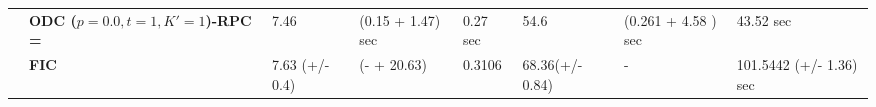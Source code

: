 {\begin{table}[htbp!]
{\begin{tabular}{|l|l|lll|lll|}
    & \textbf{ODC ($p= 0.0, t=1 , K'=1$)-RPC  = ~\cite{Chalupka:2013}} &   7.46    &   (0.15 + 1.47) sec &    0.27 sec   & 54.6  &  (0.261 + 4.58 ) sec & 43.52 sec\\%
    & \textbf{FIC ~\cite{fic06}} &   7.63 (+/- 0.4)  &   (- + 20.63)   &    0.3106     &   68.36(+/- 0.84)    &  -     & 101.5442 (+/- 1.36) sec\\%
    \bottomrule
    \end{tabular}}%
  \label{tab:tblRes}%
\end{table}%
}

%